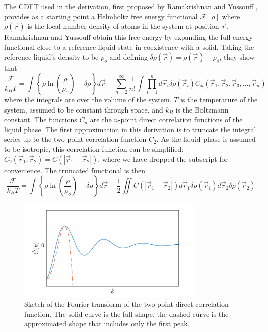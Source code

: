 The CDFT used in the derivation, first proposed by Ramakrishnan and Yussouff \cite{ramakrishnan79}, provides as a starting point a Helmholtz free energy functional $\mathcal{F}[\rho]$ where $\rho(\vec{r})$ is the local number density of atoms in the system at position $\vec{r}$. Ramakrishnan and Yussouff obtain this free energy by expanding the full energy functional close to a reference liquid state in coexistence with a solid. Taking the reference liquid's density to be $\rho_o$ and defining $\delta\rho(\vec{r})=\rho(\vec{r})-\rho_o$, they show that
\begin{equation}\label{eq:ramakF}
\frac{\mathcal{F}}{k_B T}= \int \left\{ \rho \ln\left(\frac{\rho}{\rho_o}\right)-\delta\rho \right\}d\vec{r} - \sum_{n=2}^{\infty} \frac{1}{n!} \int \prod_{i=1}^{n} d\vec{r}_i \delta\rho(\vec{r}_i)C_n(\vec{r}_1,\vec{r}_2,\vec{r}_3, ... ,\vec{r}_n)
\end{equation}
where the integrals are over the volume of the system. $T$ is the temperature of the system, assumed to be constant through space, and $k_B$ is the Boltzmann constant. The functions $C_n$ are the $n$-point direct correlation functions of the liquid phase. The first approximation in this derivation is to truncate the integral series up to the two-point correlation function $C_2$. As the liquid phase is assumed to be isotropic, this correlation function can be simplified: $C_2(\vec{r}_1,\vec{r}_2)=C(|\vec{r}_1-\vec{r}_2|)$, where we have dropped the subscript for convenience. The truncated functional is then
\begin{equation}\label{eq:ramakF_truncated}
\frac{\mathcal{F}}{k_B T}= \int \left\{ \rho \ln\left(\frac{\rho}{\rho_o}\right)-\delta\rho \right\}d\vec{r} - \frac{1}{2}\iint C(|\vec{r}_1-\vec{r}_2|)d\vec{r}_1 \delta\rho(\vec{r}_1)d\vec{r}_2 \delta\rho(\vec{r}_2)
\end{equation}

\begin{figure}[h]
\centering
\includegraphics[width=0.8\textwidth]{fig_pfc/fourierCorrelation.png}
\caption{Sketch of the Fourier transform of the two-point direct correlation function. The solid curve is the full shape, the dashed curve is the approximated shape that includes only the first peak.}\label{fig:correlation_fourier}
\end{figure}

